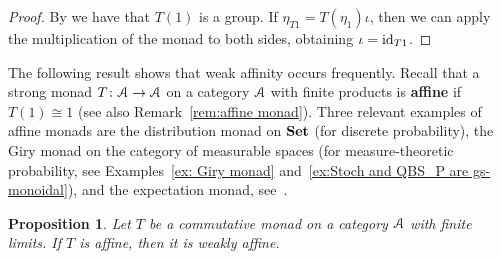 \documentclass[a4paper,UKenglish,numberwithinsect,cleveref, autoref, thm-restate]{lipics-v2021}
\theoremstyle{plain} %
\newtheorem{myproposition}[mytheorem]{Proposition}
\theoremstyle{definition} %
\begin{document}
\begin{proof}
By  we have that $T(1)$ is a group. If $\eta_{T1}=T(\eta_{1})\iota$, then  we can apply the multiplication of the monad to both sides, obtaining $\iota=\operatorname{ id}_{T1}$.
\end{proof}
The following result shows that weak affinity occurs frequently. 
Recall that a strong monad $T \colon \mathcal{A} \to \mathcal{A}$ on a category $\mathcal{A}$ with finite products is \textbf{affine} if $T(1)\cong 1$ (see also Remark~\ref{rem:affine monad}). Three relevant examples of affine monads are the distribution monad on $\mathbf{Set}$ (for discrete probability), the Giry monad on the category of measurable spaces (for measure-theoretic probability, see Examples~\ref{ex: Giry monad} and~\ref{ex:Stoch and QBS_P are gs-monoidal}), and the expectation monad, see~\cite{Jacobs16}.

\begin{myproposition}\label{prop:every affine commutative monad is weakly affine}
	Let $T$ be a commutative monad on a category $\mathcal{A}$ with finite limits. 
	If $T$ is affine, then it is weakly affine.
\end{myproposition}
\end{document}
